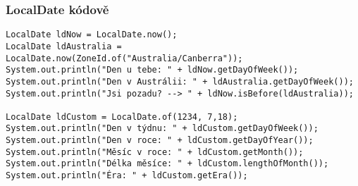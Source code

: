 \documentclass[11pt,a4paper,titlepage]{article}
\begin{document}
\subsubsection{LocalDate kódově}
\begin{verbatim}
LocalDate ldNow = LocalDate.now();
LocalDate ldAustralia = LocalDate.now(ZoneId.of("Australia/Canberra"));
System.out.println("Den u tebe: " + ldNow.getDayOfWeek());
System.out.println("Den v Austrálii: " + ldAustralia.getDayOfWeek());
System.out.println("Jsi pozadu? --> " + ldNow.isBefore(ldAustralia));

LocalDate ldCustom = LocalDate.of(1234, 7,18);
System.out.println("Den v týdnu: " + ldCustom.getDayOfWeek());
System.out.println("Den v roce: " + ldCustom.getDayOfYear());
System.out.println("Měsíc v roce: " + ldCustom.getMonth());
System.out.println("Délka měsíce: " + ldCustom.lengthOfMonth());
System.out.println("Éra: " + ldCustom.getEra());
\end{verbatim}
\end{document}

